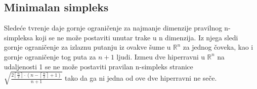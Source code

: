 \documentclass[11pt,letter]{article}
\begin{document}
\subsection[Minimalan simpleks]{Minimalan simpleks}
\bigskip
\indent Slede\' ce tvr\dj enje daje gornje ograni\v cenje za najmanje dimenzije pravilnog n-simpleksa koji se ne mo\v ze postaviti unutar trake u n dimenzija. Iz njega sledi gornje ograni\v cenje za izlaznu putanju iz ovakve \v sume u $\mathbb{R}^n$ za jednog \v coveka, kao i gornje ograni\v cenje tog puta za $n+1$ ljudi. 
\tvr Izme\dj u dve hiperravni u $\mathbb{R}^n$ na udaljenosti 1 se ne mo\v ze postaviti pravilan n-simpleks stranice $\sqrt{\frac{2\left\lceil \frac{n}{2}\right\rceil\cdot \left( n-\left\lceil\frac{n}{2}\right\rceil+1\right)}{n+1}}$ tako da ga ni jedna od ove dve hiperravni ne se\v ce.
\\
\smallskip
\\
\end{document}
